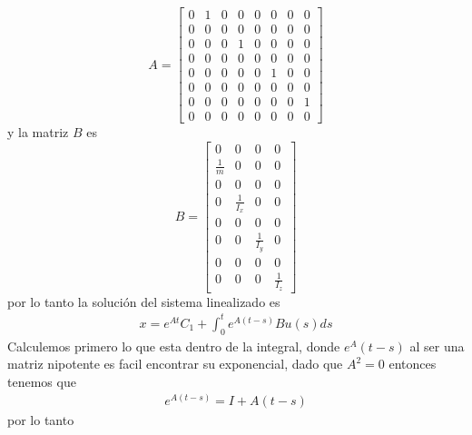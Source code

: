 \documentclass{uofa-eng-assignment}
\begin{document}
\[
A = \begin{bmatrix}
0 & 1 & 0 & 0 & 0 & 0 & 0 & 0 \\
0 & 0 & 0 & 0 & 0 & 0 & 0 & 0 \\
0 & 0 & 0 & 1 & 0 & 0 & 0 & 0 \\
0 & 0 & 0 & 0 & 0 & 0& 0 & 0  \\
0 & 0 & 0 & 0 & 0 & 1 & 0 & 0 \\
0 & 0 & 0 & 0 & 0 & 0 & 0 & 0 \\
0 & 0 & 0 & 0 & 0 & 0 & 0 & 1 \\
0 & 0 & 0 & 0 & 0 & 0 & 0 & 0 
\end{bmatrix}
\]
y la matriz $B$ es
\[
B = \begin{bmatrix}
0 & 0 & 0 & 0 \\
\frac{1}{m} & 0 & 0 & 0 \\
0 & 0 & 0 & 0 \\
0 & \frac{1}{I_x} & 0 & 0 \\
0 & 0 & 0 & 0 \\
0 & 0 & \frac{1}{I_y} & 0 \\
0 & 0 & 0 & 0 \\
0 & 0 & 0 & \frac{1}{I_z}
\end{bmatrix}
\]
por lo tanto la solución del sistema linealizado es
\begin{align*}
    x = e^{At} C_1 + \int_0^t e^{A(t-s)} B  u(s) ds  
\end{align*}
Calculemos primero lo que esta dentro de la integral, donde $e^A(t-s)$ al ser una matriz nipotente
es facil encontrar su exponencial, dado que $A^2=0$ entonces tenemos que
\begin{align*}
    e^{A(t-s)} = I + A(t-s)
\end{align*}
por lo tanto
\end{document}
